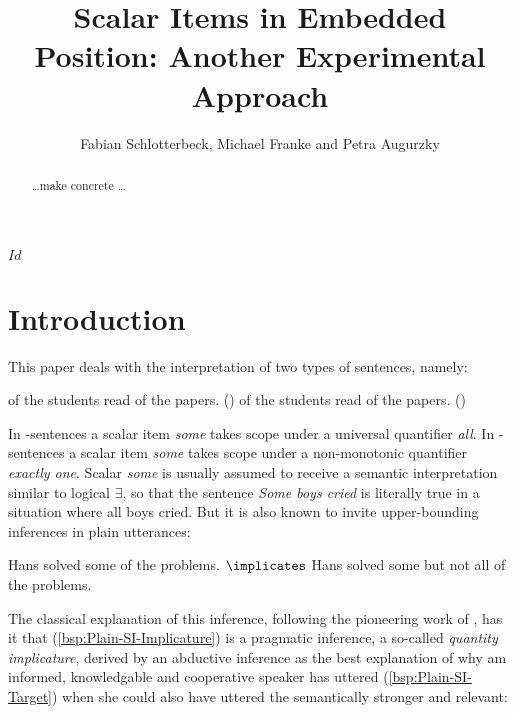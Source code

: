 \documentclass[fleqn,reqno,10pt]{article}
\title{Scalar Items in Embedded Position: {A}nother Experimental Approach}
\author{Fabian Schlotterbeck, Michael Franke and Petra Augurzky}
\date{}
\newcommand{\as}{\acro{as}}
\renewcommand{\es}{\acro{es}}
\renewcommand{\AE}{\as}
\newcommand{\GE}{\es}
\newcommand{\mymark}[1]{{\color{mycol}{#1}}}
\begin{document}
\maketitle


\begin{abstract}
  \dots make concrete \dots
\end{abstract}

\svnInfo $Id$

\section{Introduction}
\label{sec:introduction}

This paper deals with the interpretation of two types of
sentences, namely:

\begin{exe}
\ex \label{bsp:AE}
  \mymark{All} of the students read \mymark{some} of the
  papers. \hfill (\AE)
\ex \label{bsp:GE} 
  \mymark{Exactly one} of the students read \mymark{some} of the
  papers. \hfill (\GE)
\end{exe}

\noindent In \as-sentences a scalar item \emph{some} takes scope under
a universal quantifier \emph{all}. In \es-sentences a scalar item
\emph{some} takes scope under a non-monotonic quantifier \emph{exactly
  one}. Scalar \emph{some} is usually assumed to receive a semantic
interpretation similar to logical $\exists$, so that the sentence
\emph{Some boys cried} is literally true in a situation where all
boys cried. But it is also known to invite upper-bounding inferences
in plain utterances:

\begin{exe}
  \ex \label{bsp:Plain-SI}
    \begin{xlist}
      \ex \label{bsp:Plain-SI-Target} Hans solved some of the problems.
      \ex \label{bsp:Plain-SI-Implicature} $\implicates$ Hans solved some but not all of the problems.
    \end{xlist}
\end{exe}

\noindent The classical explanation of this inference, following the
pioneering work of \citet{Grice1975:Logic-and-Conve}, has it that
(\ref{bsp:Plain-SI-Implicature}) is a pragmatic inference, a so-called
\emph{quantity implicature}, derived by an abductive inference as the
best explanation of why am informed, knowledgable and cooperative
speaker has uttered (\ref{bsp:Plain-SI-Target}) when she could also
have uttered the semantically stronger and relevant:
\end{document}
